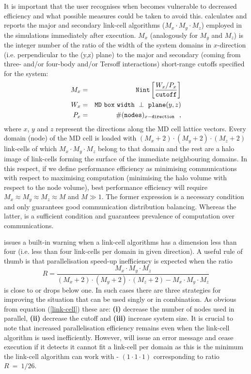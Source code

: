 It is important that the user recognises when \D becomes
vulnerable to decreased efficiency and what possible measures
could be taken to avoid this.  \D calculates and reports the
major and secondary link-cell algorithms ($M_{x} \cdot M_{y} \cdot M_{z}$)
employed in the simulations immediately after execution.  $M_{x}$
(analogously for $M_{y}$ and $M_{z}$) is the integer number of the
ratio of the width of the system domains in $x$-direction (i.e.
perpendicular to the (y,z) plane) to the major and secondary
(coming from three- and/or four-body and/or Tersoff interactions)
short-range cutoffs specified for the system:
\begin{eqnarray}
M_{x} &=& {\tt Nint} \left[ \frac{W_{x}/P_{x}}{\tt cutoff} \right] \nonumber \\
W_{x} &=& {\tt MD~box~width~\perp~plane}(y,z) \\ \label{link-cell}
P_{x} &=& \#({\tt nodes})_{x{\tt -direction}}~~, \nonumber
\end{eqnarray}
where $x$, $y$ and $z$ represent the directions along the MD cell
lattice vectors.  Every domain (node) of the MD cell is loaded with
$(M_{x}+2) \cdot (M_{y}+2) \cdot (M_{z}+2)$ link-cells of which
$M_{x} \cdot M_{y} \cdot M_{z}$ belong to that domain and the rest
are a halo image of link-cells forming the surface of the
immediate neighbouring domains.  In this respect, if we define
performance efficiency as minimising communications with respect
to maximising computation (minimising the halo volume with respect
to the node volume), best performance efficiency will require
$M_{x} \approx M_{y} \approx M_{z} \approx M$ and $M \gg 1$.
The former expression is a necessary condition and only guarantees
good communication distribution balancing.  Whereas the latter, is
a sufficient condition and guarantees prevalence of computation over
communications.

\D issues a built-in warning when a link-cell algorithms has a
dimension less than four (i.e. less than four link-cells per
domain in given direction).  A useful rule of thumb is that
parallelisation speed-up inefficiency is expected when the ratio
\begin{equation}
R = \frac{M_{x} \cdot M_{y} \cdot M_{z}}{(M_{x}+2)
\cdot (M_{y}+2) \cdot (M_{z}+2)-M_{x} \cdot M_{y} \cdot M_{z}} \label{R-factor}
\end{equation}
is close to or drops below one.  In such cases there are three
strategies for improving the situation that can be used singly or in
combination.  As obvious from equation (\ref{link-cell}) these are:
{\bf (i)} decrease the number of nodes used in parallel, {\bf (ii)}
decrease the cutoff and {\bf (iii)} increase system size.  It is
crucial to note that increased parallelisation efficiency remains
even when the link-cell algorithm is used inefficiently.  However,
\D will issue an error message and cease execution if it detects it
cannot fit a link-cell per domain as this is the minimum the \D
link-cell algorithm can work with - $(1 \cdot 1 \cdot 1)$
corresponding to ratio $R~=~1/26$.

